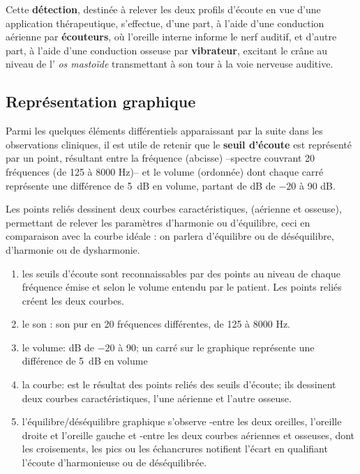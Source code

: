 Cette \textbf{détection}, destinée à relever les deux profils d'écoute
en vue d'une application thérapeutique,
s'effectue, d'une part, à l'aide d'une
conduction aérienne par \textbf{écouteurs}, où l'oreille interne
informe le nerf auditif,  et d'autre part, à l'aide
d'une conduction osseuse par\textbf{ vibrateur}, excitant le crâne au
niveau de l'
\textit{os mastoïde} transmettant à son tour à  la voie nerveuse
auditive.

\subsection{Représentation graphique}

Parmi les quelques éléments différentiels
apparaissant par la suite dans les observations cliniques, il est utile de retenir
que le \textbf{seuil d'écoute} est représenté par un point, résultant entre la
fréquence (abcisse) --spectre couvrant 20
fréquences (de 125 à 8000 Hz)--   et le volume
(ordonnée) dont chaque carré représente une différence de \SI{5}{\dB} en
volume, partant de dB de $-20$ à 90 dB.


Les points reliés dessinent deux courbes caractéristiques, (aérienne
et osseuse), permettant de relever les paramètres d'harmonie ou
          d'équilibre, ceci
 	en comparaison avec la courbe idéale : on parlera
        d'équilibre ou de
 	déséquilibre, d'harmonie ou de dysharmonie.

        \begin{enumerate}

  \item   les seuils d'écoute sont reconnaissables par des points au niveau de
          chaque fréquence émise et selon le volume entendu par le
          patient. Les points reliés créent les deux courbes.
 	\item le son : son pur en 20 fréquences différentes, de 125 à 8000 Hz.
 	\item le volume: dB de $-20$ à 90; un carré sur le graphique représente une différence de \SI{5}{\dB} en
 		volume
 	\item la courbe: est le résultat des points reliés des seuils
          d'écoute; ils
          dessinent deux courbes caractéristiques, l'une aérienne et l'autre osseuse.
\item l'équilibre/déséquilibre graphique s'observe
        -entre les deux oreilles, l'oreille droite et l'oreille gauche
        et
        -entre les deux courbes aériennes et osseuses, dont les
        croisements, les pics ou les échancrures notifient
        l'écart en
        qualifiant l'écoute d'harmonieuse ou de
        déséquilibrée.
      \end{enumerate}

